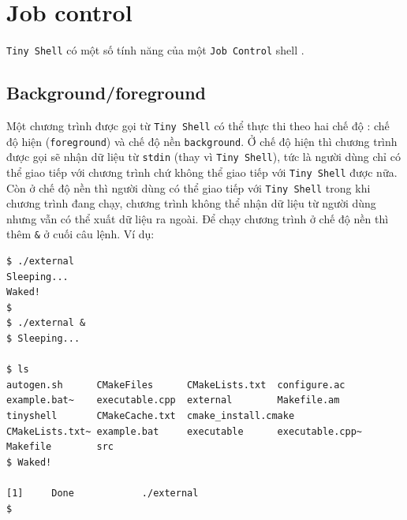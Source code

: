 \documentclass[a4paper,12pt]{report}
\begin{document}
    \section{Job control}
    \label{sec:jobcontrol}
    \texttt{Tiny Shell} có một số tính năng của một \texttt{Job Control}
    shell \cite{LCJC}.
        \subsection{Background/foreground}
	    Một chương trình được gọi từ \texttt{Tiny Shell} có thể thực thi
	    theo hai chế độ : chế độ hiện (\texttt{foreground}) và chế độ nền
	    \texttt{background}. Ở chế độ hiện thì chương trình được gọi sẽ
	    nhận dữ liệu từ \texttt{stdin} (thay vì \texttt{Tiny Shell}), tức
	    là người dùng chỉ có thể giao tiếp với chương trình chứ không thể
	    giao tiếp với \texttt{Tiny Shell} được nữa. Còn ở chế độ nền thì
	    người dùng có thể giao tiếp với \texttt{Tiny Shell} trong khi
	    chương trình đang chạy, chương trình không thể nhận dữ liệu từ
	    người dùng nhưng vẫn có thể xuất dữ liệu ra ngoài. Để chạy chương
	    trình ở chế độ nền thì thêm \texttt{\&} ở cuối câu lệnh. Ví dụ:
	
	    \begin{verbatim}
$ ./external 
Sleeping...
Waked!
$ 
$ ./external &
$ Sleeping...

$ ls
autogen.sh      CMakeFiles      CMakeLists.txt  configure.ac    
example.bat~    executable.cpp  external        Makefile.am     
tinyshell       CMakeCache.txt  cmake_install.cmake 
CMakeLists.txt~ example.bat     executable      executable.cpp~  
Makefile        src
$ Waked!

[1]     Done            ./external 
$ 
	    \end{verbatim}
	
\end{document}
